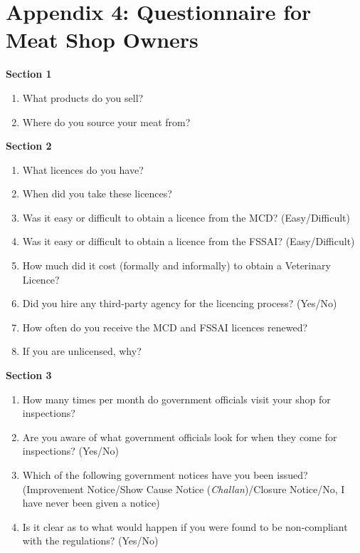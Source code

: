 \documentclass[a4paper, 12pt]{article}
\begin{document}
\newpage

\newpage
\section*{Appendix 4: Questionnaire for Meat Shop Owners}
\begin{mdframed}[backgroundcolor=gray!20]
\textbf {Section 1}
\begin{enumerate}[noitemsep]
\item What products do you sell?
\item Where do you source your meat from?
\end{enumerate}
\textbf {Section 2}
\begin{enumerate}[noitemsep]
\item What licences do you have?
\item When did you take these licences?
\item Was it easy or difficult to obtain a licence from the MCD? (Easy/Difficult)
\item Was it easy or difficult to obtain a licence from the FSSAI? (Easy/Difficult)
\item How much did it cost (formally and informally) to obtain a Veterinary Licence?
\item Did you hire any third-party agency for the licencing process? (Yes/No)
\item How often do you receive the MCD and FSSAI licences renewed?
\item If you are unlicensed, why?
\end{enumerate}
\textbf {Section 3}
\begin{enumerate}[noitemsep]
\item How many times per month do government officials visit your shop for inspections?
\item Are you aware of what government officials look for when they come for inspections? (Yes/No)
\item Which of the following government notices have you been issued? (Improvement Notice/Show Cause Notice (\textit{Challan})/Closure Notice/No, I have never been given a notice)
\item Is it clear as to what would happen if you were found to be non-compliant with the regulations? (Yes/No)

\end{enumerate}
\end{mdframed}
\end{document}
